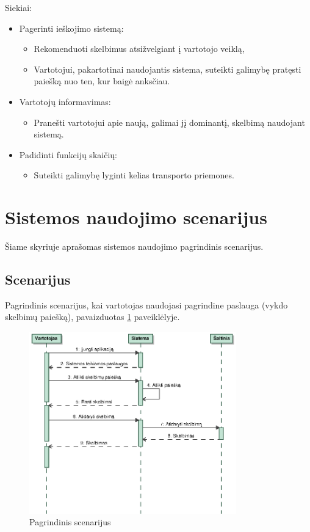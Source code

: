 \documentclass[12pt]{article}
\begin{document}
	Siekiai:
	\begin{itemize}
		\item{Pagerinti ieškojimo sistemą:}
		\begin{itemize}
			\item{Rekomenduoti skelbimus atsižvelgiant į vartotojo veiklą,}
			\item{Vartotojui, pakartotinai naudojantis sistema, suteikti galimybę pratęsti paiešką nuo ten, kur baigė anksčiau.}
		\end{itemize}
		\item{Vartotojų informavimas:}
		\begin{itemize}
			\item{Pranešti vartotojui apie naują, galimai jį dominantį, skelbimą naudojant sistemą.}
		\end{itemize}
		\item{Padidinti funkcijų skaičių:}
		\begin{itemize}
			\item{Suteikti galimybę lyginti kelias transporto priemones.}
		\end{itemize}
	\end{itemize}
	\pagebreak
	
	\section{Sistemos naudojimo scenarijus}
	Šiame skyriuje aprašomas sistemos naudojimo pagrindinis scenarijus.
	
	\subsection{Scenarijus}
	Pagrindinis scenarijus, kai vartotojas naudojasi pagrindine paslauga (vykdo skelbimų paiešką), pavaizduotas \ref{Scenario} paveiklėlyje.
	
	\begin{figure}[h]
		\begin{center}
			\includegraphics[width=0.8\textwidth]{Scenarijus.eps}
			\caption{Pagrindinis scenarijus\label{Scenario}}
		\end{center}
	\end{figure}
	
\end{document}
